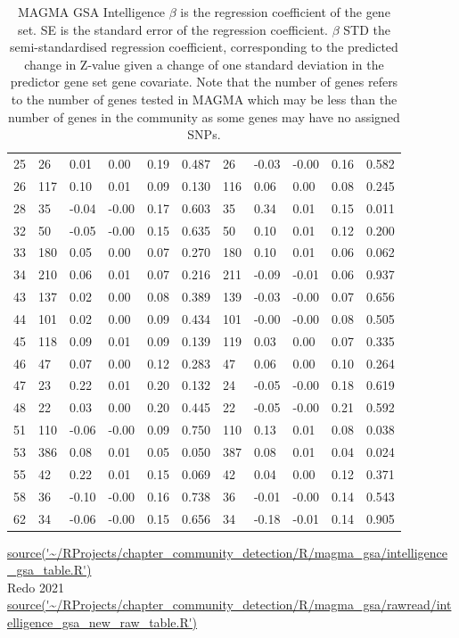 \begin{table}[ht]
\begin{tabular}{cllllllllll}
  25 & 26 & 0.01 & 0.00 & 0.19 & 0.487 & 26 & -0.03 & -0.00 & 0.16 & 0.582 \\ 
  26 & 117 & 0.10 & 0.01 & 0.09 & 0.130 & 116 & 0.06 & 0.00 & 0.08 & 0.245 \\ 
  28 & 35 & -0.04 & -0.00 & 0.17 & 0.603 & 35 & 0.34 & 0.01 & 0.15 & 0.011 \\ 
  32 & 50 & -0.05 & -0.00 & 0.15 & 0.635 & 50 & 0.10 & 0.01 & 0.12 & 0.200 \\ 
  33 & 180 & 0.05 & 0.00 & 0.07 & 0.270 & 180 & 0.10 & 0.01 & 0.06 & 0.062 \\ 
  34 & 210 & 0.06 & 0.01 & 0.07 & 0.216 & 211 & -0.09 & -0.01 & 0.06 & 0.937 \\ 
  43 & 137 & 0.02 & 0.00 & 0.08 & 0.389 & 139 & -0.03 & -0.00 & 0.07 & 0.656 \\ 
  44 & 101 & 0.02 & 0.00 & 0.09 & 0.434 & 101 & -0.00 & -0.00 & 0.08 & 0.505 \\ 
  45 & 118 & 0.09 & 0.01 & 0.09 & 0.139 & 119 & 0.03 & 0.00 & 0.07 & 0.335 \\ 
  46 & 47 & 0.07 & 0.00 & 0.12 & 0.283 & 47 & 0.06 & 0.00 & 0.10 & 0.264 \\ 
  47 & 23 & 0.22 & 0.01 & 0.20 & 0.132 & 24 & -0.05 & -0.00 & 0.18 & 0.619 \\ 
  48 & 22 & 0.03 & 0.00 & 0.20 & 0.445 & 22 & -0.05 & -0.00 & 0.21 & 0.592 \\ 
  51 & 110 & -0.06 & -0.00 & 0.09 & 0.750 & 110 & 0.13 & 0.01 & 0.08 & 0.038 \\ 
  53 & 386 & 0.08 & 0.01 & 0.05 & 0.050 & 387 & 0.08 & 0.01 & 0.04 & 0.024 \\ 
  55 & 42 & 0.22 & 0.01 & 0.15 & 0.069 & 42 & 0.04 & 0.00 & 0.12 & 0.371 \\ 
  58 & 36 & -0.10 & -0.00 & 0.16 & 0.738 & 36 & -0.01 & -0.00 & 0.14 & 0.543 \\ 
  62 & 34 & -0.06 & -0.00 & 0.15 & 0.656 & 34 & -0.18 & -0.01 & 0.14 & 0.905 \\ 
   \bottomrule
\end{tabular}
\caption[MAGMA GSA Intelligence]{MAGMA GSA Intelligence  $\beta$ is the regression coefficient of the gene set. SE is the standard error of the regression coefficient. $\beta$ STD the semi-standardised regression coefficient, corresponding to the predicted
change in Z-value given a change of one standard deviation in the predictor gene set  gene covariate.  Note that the number of genes refers to the number of genes tested in MAGMA which may be less than the number of genes in the community as some genes may have no assigned SNPs.} 
\tiny\url{source('~/RProjects/chapter_community_detection/R/magma_gsa/intelligence_gsa_table.R')}\\
Redo 2021 \url{source('~/RProjects/chapter_community_detection/R/magma_gsa/rawread/intelligence_gsa_new_raw_table.R')}
\label{tab:MAGMA GSA Intelligence }
\end{table}



